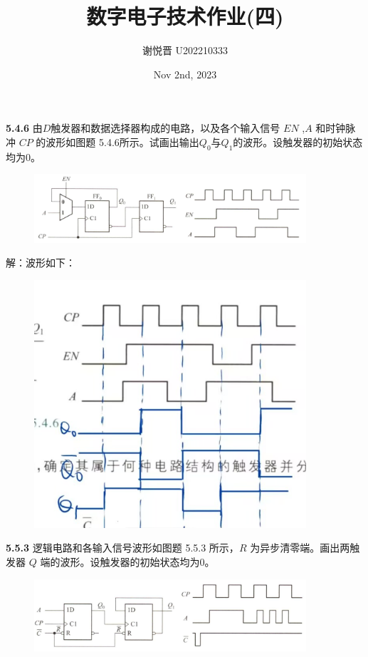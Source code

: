 \documentclass[a4paper,11pt,UTF8]{article}
\title{数字电子技术作业(四)}
\author{谢悦晋 \quad U202210333}
\date{Nov 2nd, 2023 }
\begin{document}
\maketitle
\textbf{5.4.6} 由$D$触发器和数据选择器构成的电路，以及各个输入信号 $EN$ ,$A$ 和时钟脉冲 $CP$ 的波形如图题 5.4.6所示。试画出输出$Q_0$与$Q_1$的波形。设触发器的初始状态均为0。
\begin{figure}[H]
	\centering
	\includegraphics[width=0.9\textwidth]{5.4.6}
\end{figure}
解：波形如下：
\begin{figure}[H]
	\centering
	\includegraphics[width=0.9\textwidth]{5.4.6_1}
\end{figure}
\textbf{5.5.3} 逻辑电路和各输入信号波形如图题 5.5.3 所示，$R$ 为异步清零端。画出两触发器 $Q$ 端的波形。设触发器的初始状态均为0。
\begin{figure}[H]
	\centering
	\includegraphics[width=0.9\textwidth]{5.5.3}
\end{figure}
\end{document}
